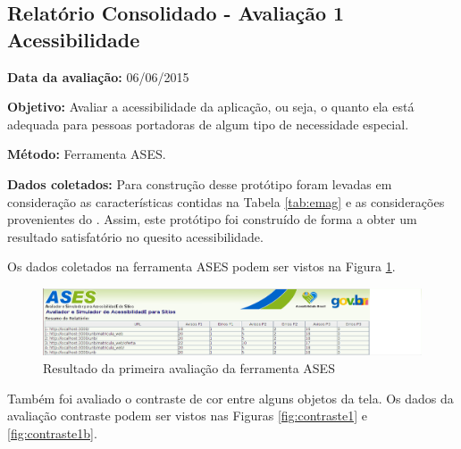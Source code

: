 \subsection{Relatório Consolidado - Avaliação 1 Acessibilidade}

\flushleft \textbf{Data da avaliação:} 
06/06/2015

\textbf{Objetivo:}
Avaliar a acessibilidade da aplicação, ou seja, o quanto ela está adequada para pessoas portadoras de algum tipo
de necessidade especial.

\textbf{Método:}
Ferramenta ASES.

\textbf{Dados coletados:}
Para construção desse protótipo foram levadas em consideração as características contidas na Tabela \ref{tab:emag} e 
as considerações provenientes do \cite{emag}. Assim, este protótipo foi construído de forma a obter um resultado
satisfatório no quesito acessibilidade.

Os dados coletados na ferramenta ASES podem ser vistos na Figura \ref{fig:avaliacao_ases1}.

\begin{figure}[h!]
  \centering
    \includegraphics[keepaspectratio=true, scale=0.6]{figuras/avaliacao_ases1.png}
  \caption{Resultado da primeira avaliação da ferramenta ASES}
  \label{fig:avaliacao_ases1}
\end{figure}

Também foi avaliado o contraste de cor entre alguns objetos da tela. Os dados da avaliação contraste podem ser vistos nas Figuras \ref{fig:contraste1} e \ref{fig:contraste1b}.

